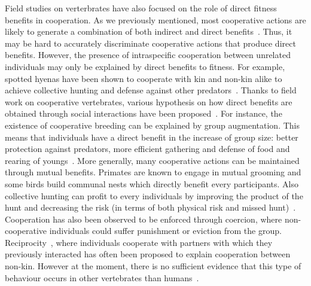     Field studies on verterbrates have also focused on the role of direct fitness benefits in cooperation. As we previously mentioned, most cooperative actions are likely to generate a combination of both indirect and direct benefits~\parencite{Clutton-Brock2009}. Thus, it may be hard to accurately discriminate cooperative actions that produce direct benefits. However, the presence of intraspecific cooperation between unrelated individuals may only be explained by direct benefits to fitness. For example, spotted hyenas have been shown to cooperate with kin and non-kin alike to achieve collective hunting and defense against other predators~\parencite{Drea2009a, Smith2010, Smith2012a}. Thanks to field work on cooperative vertebrates, various hypothesis on how direct benefits are obtained through social interactions have been proposed~\parencite{Clutton-Brock2002}. For instance, the existence of cooperative breeding can be explained by group augmentation. This means that individuals have a direct benefit in the increase of group size: better protection against predators, more efficient gathering and defense of food and rearing of youngs~\parencite{Packer2001}. More generally, many cooperative actions can be maintained through mutual benefits. Primates are known to engage in mutual grooming and some birds build communal nests which directly benefit every participants. Also collective hunting can profit to every individuals by improving the product of the hunt and decreasing the risk (in terms of both physical risk and missed hunt)~\parencite{Scheel1991}. Cooperation has also been observed to be enforced through coercion, where non-cooperative individuals could suffer punishment or eviction from the group. Reciprocity~\parencite{Trivers1971}, where individuals cooperate with partners with which they previously interacted has often been proposed to explain cooperation between non-kin. However at the moment, there is no sufficient evidence that this type of behaviour occurs in other vertebrates than humans~\parencite{Hammerstein2003, Clutton-Brock2009, Andre2014}.




